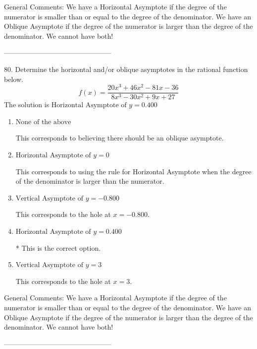 \documentclass{extbook}[14pt]
\begin{document}
General Comments: We have a Horizontal Asymptote if the degree of the numerator is smaller than or equal to the degree of the denominator. We have an Oblique Asymptote if the degree of the numerator is larger than the degree of the denominator. We cannot have both!

-----------------------------------------------

80. Determine the horizontal and/or oblique asymptotes in the rational function below.
\[ f(x) = \frac{20x^{3} +46 x^{2} -81 x -36}{8x^{3} -30 x^{2} +9 x + 27} \] 
The solution is $ \text{Horizontal Asymptote of } y = 0.400  $ 

\begin{enumerate}[label=\Alph*.] 
\item $ \text{None of the above} $ 

 This corresponds to believing there should be an oblique asymptote. 
\item $ \text{Horizontal Asymptote of } y = 0  $ 

 This corresponds to using the rule for Horizontal Asymptote when the degree of the denominator is larger than the numerator. 
\item $ \text{Vertical Asymptote of } y = -0.800  $ 

 This corresponds to the hole at $x = -0.800$. 
\item $ \text{Horizontal Asymptote of } y = 0.400  $ 

 * This is the correct option. 
\item $ \text{Vertical Asymptote of } y = 3  $ 

 This corresponds to the hole at $x = 3$. 
\end{enumerate} 
 
General Comments: We have a Horizontal Asymptote if the degree of the numerator is smaller than or equal to the degree of the denominator. We have an Oblique Asymptote if the degree of the numerator is larger than the degree of the denominator. We cannot have both!

-----------------------------------------------
\end{document}
